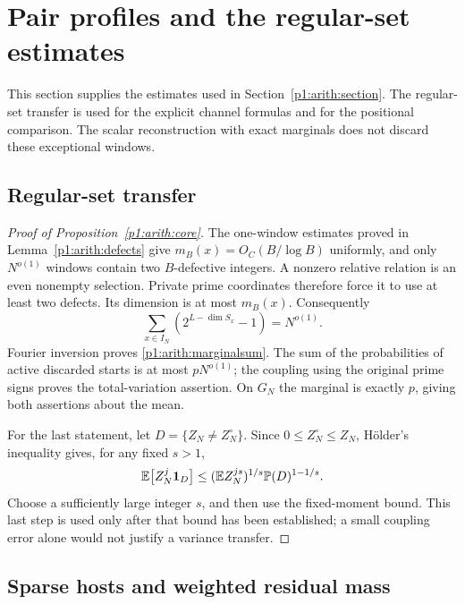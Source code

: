 \section{Pair profiles and the regular-set estimates}
\label{p14:comp:pair-profiles}

This section supplies the estimates used in Section~\ref{p1:arith:section}.
The regular-set transfer is used for the explicit channel formulas and for
the positional comparison. The scalar reconstruction with exact marginals
does not discard these exceptional windows.

\subsection{Regular-set transfer}
\label{p14:comp:regular-transfer}

\begin{proof}[Proof of Proposition~\ref{p1:arith:core}]
The one-window estimates proved in Lemma~\ref{p1:arith:defects} give
$m_B(x)=O_C(B/\log B)$ uniformly, and only $N^{o(1)}$ windows contain two
$B$-defective integers.  A nonzero relative relation is an even nonempty
selection.  Private prime coordinates therefore force it to use at least two
defects.  Its dimension is at most $m_B(x)$.  Consequently
\[
 \sum_{x\in I_N}(2^{L-\dim S_x}-1)=N^{o(1)}.
\]
Fourier inversion proves \eqref{p1:arith:marginalsum}.  The sum of the
probabilities of active discarded starts is at most $pN^{o(1)}$; the coupling
using the original prime signs proves the total-variation assertion.  On $G_N$
the marginal is exactly $p$, giving both assertions about the mean.

For the last statement, let $D=\{Z_N\ne Z_N^\circ\}$.  Since
$0\leq Z_N^\circ\leq Z_N$, H\"older's inequality gives, for any fixed $s>1$,
\[
 \mathbb E\big[Z_N^j\mathbf 1_D\big]
 \leq(\mathbb E Z_N^{js})^{1/s}\mathbb P(D)^{1-1/s}.
\]
Choose a sufficiently large integer $s$, and then use the fixed-moment bound.
This last step is used only after that bound has been established; a small
coupling error alone would not justify a variance transfer.
\end{proof}

\subsection{Sparse hosts and weighted residual mass}
\label{p14:comp:sparse-hosts}


